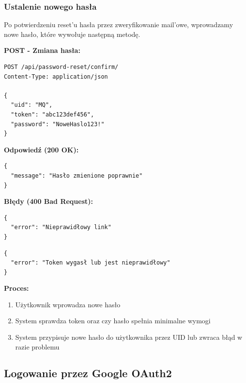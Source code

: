 \documentclass[a4paper,12pt]{article}
\begin{document}
\newpage

\subsubsection{Ustalenie nowego hasła}

Po potwierdzeniu reset'u hasła przez zweryfikowanie mail'owe, wprowadzamy nowe hasło, które wywołuje następną metodę.

\vspace{0.5cm}

\textbf{POST - Zmiana hasła:}
\begin{lstlisting}
POST /api/password-reset/confirm/
Content-Type: application/json

{
  "uid": "MQ",
  "token": "abc123def456",
  "password": "NoweHaslo123!"
}
\end{lstlisting}

\vspace{0.5cm}

\textbf{Odpowiedź (200 OK):}
\begin{lstlisting}
{
  "message": "Hasło zmienione poprawnie"
}
\end{lstlisting}

\vspace{0.5cm}

\textbf{Błędy (400 Bad Request):}
\begin{lstlisting}
{
  "error": "Nieprawidłowy link"
}
\end{lstlisting}

\begin{lstlisting}
{
  "error": "Token wygasł lub jest nieprawidłowy"
}
\end{lstlisting}

\vspace{0.5cm}

\textbf{Proces:}
\begin{enumerate}[label=\arabic*.]
    \item Użytkownik wprowadza nowe hasło
    \item System sprawdza token oraz czy hasło spełnia minimalne wymogi
    \item System przypisuje nowe hasło do użytkownika przez UID lub zwraca błąd w razie problemu
\end{enumerate}

\newpage

\subsection{Logowanie przez Google OAuth2}
\end{document}
